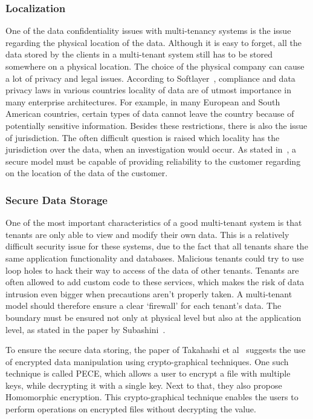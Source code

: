 \subsubsection{Localization}
One of the data confidentiality issues with multi-tenancy systems is the issue regarding the physical location of the data. 
Although it is easy to forget, all the data stored by the clients in a multi-tenant system still has to be stored somewhere on a physical location. 
The choice of the physical company can cause a lot of privacy and legal issues. 
According to Softlayer~\cite{Softlayer2009Security}, compliance and data privacy laws in various countries locality of data are of utmost importance in many enterprise architectures. 
For example, in many European and South American countries, certain types of data cannot leave the country because of potentially sensitive information. 
Besides these restrictions, there is also the issue of jurisdiction.
The often difficult question is raised which locality has the jurisdiction over the data, when an investigation would occur.
As stated in~\cite{Subashini2011Security}, a secure model must be capable of providing reliability to the customer regarding on the location of the data of the customer.

\subsubsection{Secure Data Storage}
One of the most important characteristics of a good multi-tenant system is that tenants are only able to view and modify their own data. This is a relatively difficult security issue for these systems, due to the fact that all tenants share the same application functionality and databases. Malicious tenants could try to use loop holes to hack their way to access of the data of other tenants. Tenants are often allowed to add custom code to these services, which makes the risk of data intrusion even bigger when precautions aren’t properly taken. A multi-tenant model should therefore ensure a clear ‘firewall’ for each tenant’s data. The boundary must be ensured not only at physical level but also at the application level, as stated in the paper by Subashini~\cite{Subashini2011Security}.

To ensure the secure data storing, the paper of Takahashi et al~\cite{Takahashi2012Security} suggests the use of encrypted data manipulation using crypto-graphical techniques. 
One such technique is called \acf{PECE}, which allows a user to encrypt a file with multiple keys, while decrypting it with a single key. 
Next to that, they also propose Homomorphic encryption. 
This crypto-graphical technique enables the users to perform operations on encrypted files without decrypting the value.

